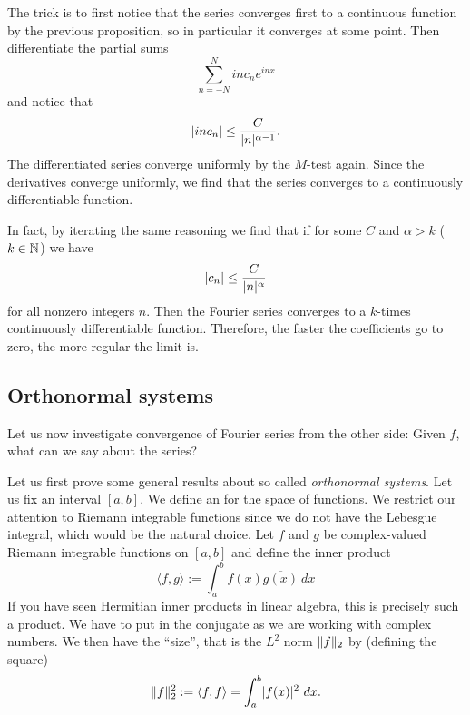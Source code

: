 The trick is to first notice that the series converges first to a continuous
function by the previous proposition, so in particular it converges at some
point.  Then differentiate the partial sums
\begin{equation*}
\sum_{n=-N}^{N}
i n c_n e^{inx}
\end{equation*}
and notice that 
\begin{equation*}
\lvert {i n c_n} \rvert \leq \frac{C}{\lvert {n} \rvert^{\alpha-1}} .
\end{equation*}
The differentiated series converge uniformly by the $M$-test again.  Since
the derivatives converge uniformly, we find that the series converges 
to a continuously differentiable function.

In fact, by iterating the same reasoning we find that if
for some $C$ and $\alpha > k$ ($k \in {\mathbb{N}}$) we have
\begin{equation*}
\lvert {c_n} \rvert 
\leq \frac{C}{\lvert {n} \rvert^\alpha}
\end{equation*}
for all nonzero integers $n$.  Then 
the Fourier series converges to a $k$-times continuously differentiable
function.  Therefore, the faster the coefficients go to zero, the more
regular the limit is.

\subsection{Orthonormal systems}

Let us now investigate convergence of Fourier series from the other side:
Given $f$, what can we say about the series?

Let us first prove some general results about so called
\emph{orthonormal systems}.
Let us fix an interval $[a,b]$.  We define an
\emph{} for the space of functions.  We restrict our attention
to Riemann integrable functions since we do not have the Lebesgue
integral, which
would be the natural choice.  Let $f$ and $g$ be complex-valued 
Riemann integrable functions on $[a,b]$ and define the inner product
\begin{equation*}
\langle f , g \rangle :=
\int_a^b f(x) \overline{g(x)} ~ dx
\end{equation*}
If you have seen Hermitian inner products in linear algebra, this
is precisely such a product.  We have to put in the conjugate as we are
working with complex numbers.  We then have the ``size'', that is the
$L^2$ norm $\lVert {f} \rVert_2$ by (defining the square)
\begin{equation*}
\lVert {f} \rVert_2^2 :=
\langle f , f \rangle =
\int_a^b \lvert {f(x)} \rvert^2 ~ dx .
\end{equation*}

